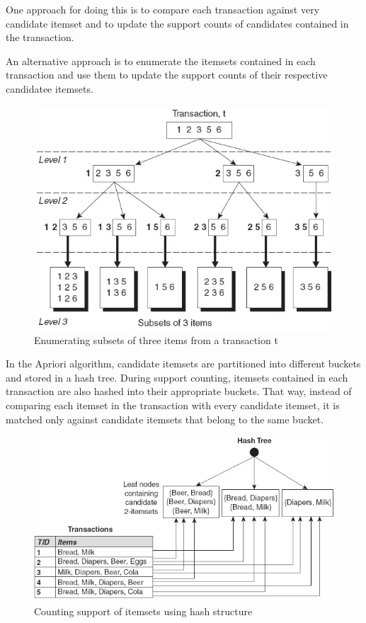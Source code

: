 	One approach for doing this is to compare each transaction against very candidate itemset and 
	to update the support counts of candidates contained in the transaction. 

	An alternative approach is to enumerate the itemsets contained in each 
	transaction and use them  to update the support counts of their respective candidatee itemsets.
	
		\begin{figure}[H]
		\centering
		\includegraphics[scale=0.5]{pics/enumerateSubsets.png}
		\caption{Enumerating subsets of three items from a transaction t}
		\end{figure}

	In the Apriori algorithm, candidate itemsets are partitioned into different buckets and stored
	in a hash tree. During support counting, itemsets contained in each transaction are also hashed 
	into their appropriate buckets. That way, instead of comparing each itemset in the transaction 
	with every candidate itemset, it is matched only against candidate itemsets that belong to the 
	same bucket. 

		\begin{figure}[H]
			\centering
			\includegraphics[scale=0.5]{pics/supportCount.png}
			\caption{Counting support of itemsets using hash structure}
		\end{figure}

